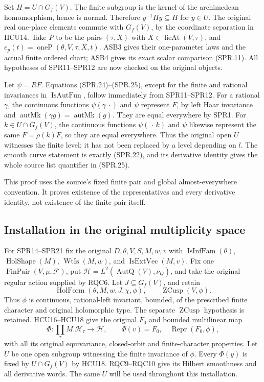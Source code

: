 \documentclass[11pt,a4paper]{article}
\numberwithin{equation}{section}
\theoremstyle{remark}\newtheorem{remark}[theorem]{Remark}
\begin{document}
Set \(H=U\cap G_f(V)\).
The finite subgroup is the kernel of the archimedean homomorphism,
hence is normal.  Therefore \(y^{-1}Hy\subseteq H\) for \(y\in U\).
The original real one-place elements commute with \(G_f(V)\),
by the coordinate separation in HCU14.
Take \(P\) to be the pairs \((\tau,X)\) with
\(X\in\operatorname{lieAt}(V,\tau)\), and
\(e_p(t)=\operatorname{oneP}(\theta,V,\tau,X,t)\).
ASB3 gives their one-parameter laws and the actual finite ordered
chart; ASB4 gives its exact scalar comparison (SPR.11).
All hypotheses of SPR11--SPR12 are now checked on the original
objects.

Let \(\psi=RF\).  Equations (SPR.24)--(SPR.25), except for the
finite and rational invariances in \(\operatorname{IsAutFun}\),
follow immediately from SPR11--SPR12.
For a rational \(\gamma\), the continuous functions
\(\psi(\gamma\,\cdot)\) and \(\psi\) represent \(F\), by left
Haar invariance and
\(\operatorname{autMk}(\gamma g)=\operatorname{autMk}(g)\).
They are equal everywhere by SPR1.
For \(k\in U\cap G_f(V)\), the continuous functions
\(\psi(\,\cdot\,k)\) and \(\psi\) likewise represent the same
\(F=\rho(k)F\), so they are equal everywhere.
Thus the original open \(U\) witnesses the finite level; it has
not been replaced by a level depending on \(l\).
The smooth curve statement is exactly (SPR.22), and its derivative
identity gives the whole source list quantifier in (SPR.25).

This proof uses the source's fixed finite pair and global
almost-everywhere convention.  It proves existence of the
representatives and every derivative identity, not existence
of the finite pair itself.

\subsection{Installation in the original multiplicity space}

For SPR14--SPR21 fix the original \(D,\theta,V,S,M,w,v\)
with \(\operatorname{IsInfFam}(\theta)\),
\(\operatorname{HolShape}(M)\), \(\operatorname{WtIs}(M,w)\), and
\(\operatorname{IsExtVec}(M,v)\).
Fix one \(\operatorname{FinPair}(V,\mu,\mathcal F)\), put
\(\mathcal H=L^2(\operatorname{AutQ}(V),\nu_Q)\), and take the
original regular action supplied by RQC6.
Let \(J\subseteq G_f(V)\), and retain
\[
 \operatorname{HolForm}(\theta,M,w,J,\chi,\phi),
                 \qquad \operatorname{ZCusp}(V,\phi).
 \tag{SPR.27}
\]
Thus \(\phi\) is continuous, rational-left invariant, bounded,
of the prescribed finite character and original holomorphic type.
The separate \(\operatorname{ZCusp}\) hypothesis is retained.
HCU16--HCU18 give the original \(F_0\) and bounded multilinear map
\[
       \Phi:\prod_\tau M.\mathcal H_\tau\longrightarrow\mathcal H,
       \qquad \Phi(v)=F_0,\quad
                     \operatorname{Repr}(F_0,\phi),
 \tag{SPR.28}
\]
with all its original equivariance, closed-orbit and finite-character
properties.
Let \(U\) be one open subgroup witnessing the finite invariance
of \(\phi\).  Every \(\Phi(y)\) is fixed by \(U\cap G_f(V)\)
by HCU18.  RQC9--RQC10 give its Hilbert smoothness and all derivative
words.  The same \(U\) will be used throughout this installation.
\end{document}
